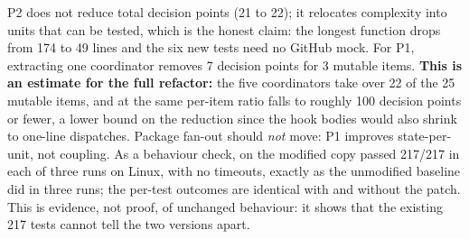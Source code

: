 P2 does not reduce total decision points (21 to 22); it relocates complexity into units that can be tested, which is the
honest claim: the longest function drops from 174 to 49 lines and the six new tests need no GitHub mock. For P1, extracting
one coordinator removes 7 decision points for 3 mutable items. \textbf{This is an estimate for the full refactor:} the
five coordinators take over 22 of the 25 mutable items, and at the same per-item ratio  falls to roughly
100 decision points or fewer, a lower bound on the reduction since the hook bodies would also shrink to one-line
dispatches. Package fan-out should \emph{not} move: P1 improves state-per-unit, not coupling. As a behaviour check,
 on the modified copy passed 217/217 in each of three runs on Linux, with no
timeouts, exactly as the unmodified baseline did in three runs; the per-test outcomes are identical with and without
the patch. This is evidence, not proof, of unchanged behaviour: it shows that the existing 217 tests cannot tell the
two versions apart.

